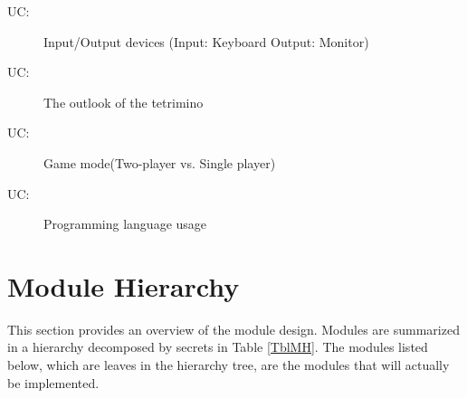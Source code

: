 \documentclass[12pt, titlepage]{article}
\newcounter{ucnum}
\newcommand{\uctheucnum}{UC\theucnum}
\begin{document}
\begin{description}
\item[ \uctheucnum \label{ucIO}:] Input/Output devices (Input: Keyboard Output: Monitor)
\item[ \uctheucnum \label{ucOutlook}:]The outlook of the tetrimino
\item[ \uctheucnum \label{ucGame}:] Game mode(Two-player vs. Single player)
\item[ \uctheucnum \label{ucProg}:] Programming language usage


\end{description}

\section{Module Hierarchy} \label{SecMH}

This section provides an overview of the module design. Modules are summarized
in a hierarchy decomposed by secrets in Table \ref{TblMH}. The modules listed
below, which are leaves in the hierarchy tree, are the modules that will
actually be implemented.
\end{document}
